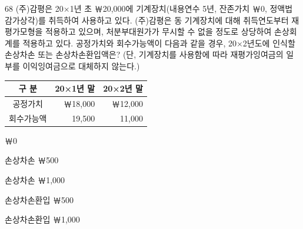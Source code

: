 \begin{question}{68}
(주)감평은 20×1년 초 ￦20,000에 기계장치(내용연수 5년, 잔존가치 ￦0, 정액법 감가상각)를 취득하여 사용하고 있다. (주)감평은 동 기계장치에 대해 취득연도부터 재평가모형을 적용하고 있으며, 처분부대원가가 무시할 수 없을 정도로 상당하여 손상회계를 적용하고 있다. 공정가치와 회수가능액이 다음과 같을 경우, 20×2년도에 인식할 손상차손 또는 손상차손환입액은? (단, 기계장치를 사용함에 따라 재평가잉여금의 일부를 이익잉여금으로 대체하지 않는다.)
\par{\small\centering\begin{tabular}{|c|r|r|}\hline
구 분 & 20×1년 말 & 20×2년 말 \\ \hline
공정가치 & ￦18,000 & ￦12,000 \\
회수가능액 & 19,500 & 11,000 \\ \hline
\end{tabular}\par}
\begin{choices}
  \item ￦0
  \item 손상차손 ￦500
  \item 손상차손 ￦1,000
  \item 손상차손환입 ￦500
  \item 손상차손환입 ￦1,000
\end{choices}
\end{question}
